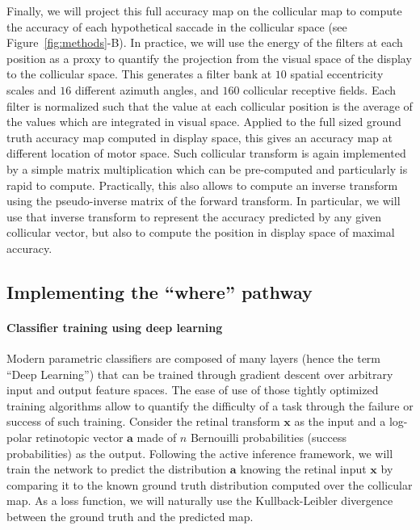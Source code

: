 Finally, we will project this full accuracy map on the collicular map to compute the accuracy of each hypothetical saccade in the collicular space (see  Figure~\ref{fig:methods}-B). In practice, we will use the energy of the filters at each position as a proxy to quantify the projection from the visual space of the display to the collicular space. This generates a filter bank at $10$ spatial eccentricity scales and $16$ different azimuth angles, and $160$ collicular receptive fields. Each filter is normalized such that the value at each collicular position is the average of the values which are integrated in visual space. Applied to the full sized ground truth accuracy map computed in display space, this gives an accuracy map at different location of motor space. Such collicular transform is again implemented by a simple matrix multiplication which can be pre-computed and particularly is rapid to compute. Practically, this also allows to compute an inverse transform using the pseudo-inverse matrix of the forward transform. In particular, we will use that inverse transform to represent the accuracy predicted by any given collicular vector, but also to compute the position in display space of maximal accuracy.

\subsection{Implementing the ``where'' pathway}

\paragraph{Classifier training using deep learning}
Modern parametric classifiers are composed of many layers (hence the term ``Deep Learning'') that can be trained through gradient descent over arbitrary input and output feature spaces. The ease of use of those tightly optimized training algorithms allow to quantify the difficulty of a task through the failure or success of such training. Consider the retinal transform $\boldsymbol{x}$ as the input and a log-polar retinotopic vector $\boldsymbol{a}$ made of $n$ Bernouilli probabilities (success probabilities) as the output. Following the active inference framework, we will train the network to predict the distribution $\boldsymbol{a}$ knowing the retinal input $\boldsymbol{x}$ by comparing it to the known ground truth distribution computed over the collicular map. As a loss function, we will naturally use the Kullback-Leibler divergence between the ground truth and the predicted map.

